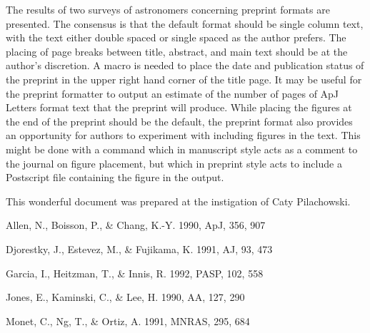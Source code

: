 The results of two surveys of astronomers concerning preprint formats are 
presented.  The consensus is that the default format should be single column
text, with the text either double spaced or single spaced as the author 
prefers.  The placing of page breaks between title, abstract, and main text 
should be at the author's discretion.  A macro is needed to place the
date and publication status of the preprint in the upper right hand corner
of the title page.  It may be useful for the preprint formatter to output 
an estimate of the number of pages of ApJ Letters format text that the 
preprint will produce.  While placing the figures at the end of the preprint
should be the default, the preprint format also provides an opportunity for
authors to experiment with including figures in the text.  This might 
be done with a command which in manuscript style acts as a comment to
the journal on figure placement, but which in preprint style acts to include 
a Postscript file containing the figure in the output.  

\acknowledgments
This wonderful document was prepared at the instigation of Caty Pilachowski.

\begin{references}

Allen, N., Boisson, P., \& Chang, K.-Y.
1990, ApJ, 356, 907

Djorestky, J., Estevez, M., \& Fujikama, K.
1991, AJ, 93, 473

Garcia, I., Heitzman, T., \& Innis, R.
1992, PASP, 102, 558

Jones, E., Kaminski, C., \& Lee, H.
1990, AA, 127, 290

Monet, C., Ng, T., \& Ortiz, A.
1991, MNRAS, 295, 684

\end{references}


